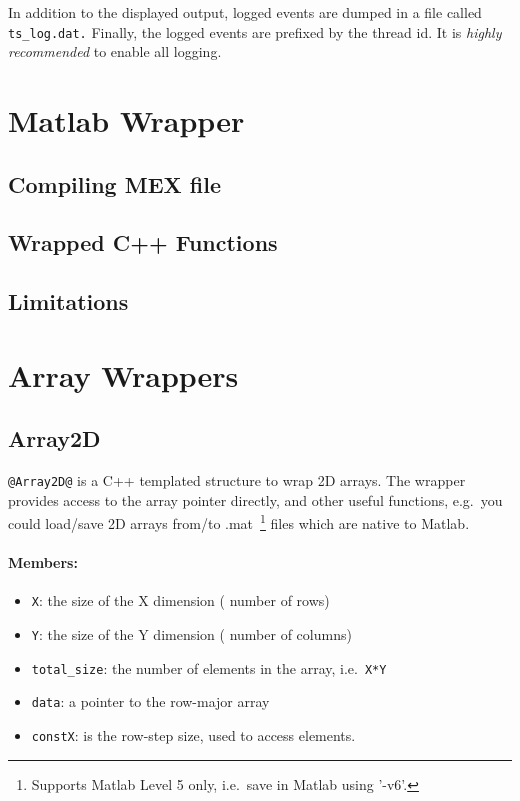 \documentclass[12pt,letterpaper]{article}
\makeatletter
\def\keyhl[#1]{\lstinline{@#1@}}
\makeatother
\begin{document}
In addition to the displayed output, logged events are dumped in a file called \mbox{\lstinline{ts_log.dat.}} Finally, the logged events are prefixed by the thread id.
It is {\em highly recommended} to enable all logging.
\section{Matlab Wrapper}
\subsection{Compiling MEX file}
\subsection{Wrapped C++ Functions}
\subsection{Limitations}
\newpage
\appendix
\section{Array Wrappers}
\label{ap:wrappers}
\subsection{Array2D}
\keyhl[Array2D] is a C++ templated structure to wrap 2D arrays. The wrapper provides access to the array pointer directly, and other useful functions, e.g.~you could load/save 2D arrays from/to .mat~\footnote{Supports Matlab Level 5 only, i.e.~save in Matlab using '-v6'.} files which are native to Matlab.
\paragraph{Members:}\hspace{-2ex}
\begin{itemize}
\item \lstinline{X}: the size of the X dimension ( number of rows)
\item \lstinline{Y}: the size of the Y dimension ( number of columns)
\item \lstinline{total_size}: the number of elements in the array, i.e.~\lstinline{X*Y}
\item \lstinline{data}: a pointer to the row-major array
\item \lstinline{constX}: is the row-step size, used to access elements.
\end{itemize}
\end{document}
